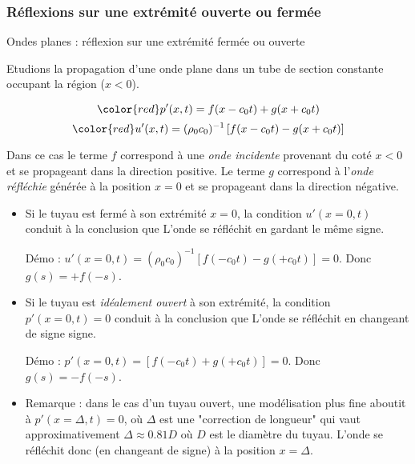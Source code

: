 \subsubsection{Réflexions sur une extrémité ouverte ou fermée}
\begin{frame}{Ondes planes : réflexion sur une extrémité fermée ou ouverte}

\small

Etudions la propagation d'une onde plane dans un tube de section
constante occupant la région ($x<0$).

\[ \color{red}
	p'(x, t) =   f(x-c_0 t) + g(x+c_0 t)
\]
\[ \color{red}
	u'(x, t) = (\rho_0 c_0)^{-1} \left[  f(x-c_0 t) - g(x+c_0 t) \right]
\]

Dans ce cas le terme $f$ correspond à une {\em onde incidente} provenant du coté $x<0$ et se propageant dans la direction positive. Le terme $g$ correspond à l'{\em onde réfléchie} générée à la position $x=0$ et se propageant dans la direction négative.

\begin{itemize}

\item Si le tuyau est fermé à son extrémité $x=0$, la condition $u'(x=0,t)$ conduit à la conclusion que {\color{red} L'onde se réfléchit en gardant le même signe}.

\textcolor{gris}{Démo : $u'(x=0,t) = (\rho_0 c_0)^{-1} [f(-c_0t) - g(+c_0t) ] = 0.$ Donc $g(s) = +f(-s)$.} 

\item Si le tuyau est {\em idéalement ouvert} à son extrémité, la condition $p'(x=0,t)=0$ conduit à 
la conclusion que {\color{red} L'onde se réfléchit en changeant de signe signe}.

\textcolor{gris}{Démo : $p'(x=0,t) =  [f(-c_0t) + g(+c_0t) ] = 0.$ Donc $g(s) = -f(-s)$.} 

\item { \color{gris} Remarque : dans le cas d'un tuyau ouvert, une modélisation plus fine aboutit à $p'(x=\Delta ,t) = 0$, où $\Delta$ est une "correction de longueur" 
qui vaut approximativement $\Delta \approx 0.81 D$ où $D$ est le diamètre du tuyau.
L'onde se réfléchit donc (en changeant de signe) à la position $x=\Delta$.}

\end{itemize}


\end{frame}



